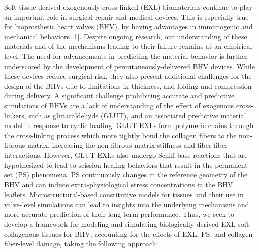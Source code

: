     Soft-tissue-derived exogenously cross-linked (EXL) biomaterials continue to play an important role in surgical repair and medical devices. This is especially true for bioprosthetic heart valves (BHV), by having advantages in immunogenic and mechanical behaviors [1]. Despite ongoing research, our understanding of these materials and of the mechanisms leading to their failure remains at an empirical level. The need for advancements in predicting the material behavior is further underscored by the development of percutaneously-delivered BHV devices. While these devices reduce surgical risk, they also present additional challenges for the design of the BHVs due to limitations in thickness, and folding and compression during delivery. A significant challenge prohibiting accurate and predictive simulations of BHVs are a lack of understanding of the effect of exogenous cross-linkers, such as glutaraldehyde (GLUT), and an associated predictive material model in response to cyclic loading. GLUT EXLs form polymeric chains through the cross-linking process which more tightly bond the collagen fibers to the non-fibrous matrix, increasing the non-fibrous matrix stiffness and fiber-fiber interactions. However, GLUT EXLs also undergo Schiff-base reactions that are hypothesized to lead to scission-healing behaviors that result in the permanent set (PS) phenomena. PS continuously changes in the reference geometry of the BHV and can induce extra-physiological stress concentrations in the BHV leaflets. Microstructural-based constitutive models for tissues and their use in valve-level simulations can lead to insights into the underlying mechanisms and more accurate prediction of their long-term performance. Thus, we seek to develop a framework for modeling and simulating biologically-derived EXL soft collagenous tissues for BHV, accounting for the effects of EXL, PS, and collagen fiber-level damage, taking the following approach:


